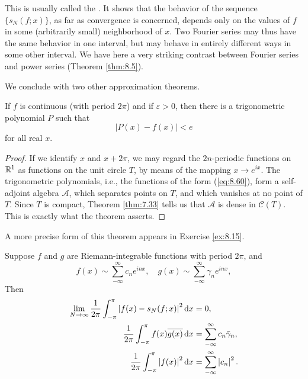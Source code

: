 This is usually called the . 
It shows that the behavior of the sequence $\{s_N(f; x)\}$, as far as convergence is concerned, depends only on the values of $f$ in some (arbitrarily small) neighborhood of $x$. 
Two Fourier series may thus have the same behavior in one interval, but may behave in entirely different ways in some other interval. 
We have here a very striking contrast between Fourier series and power series (Theorem \ref{thm:8.5}).

We conclude with two other approximation theorems.


\begin{thm}
    \label{thm:8.15}
    If $f$ is continuous (with period $2\pi$) and if $\varepsilon > 0$, then there is a trigonometric polynomial $P$ such that 
    \begin{equation*}
        |P(x) - f(x) | < e
    \end{equation*}
    for all real $x$.
\end{thm}

\begin{proof}
    If we identify $x$ and $x + 2\pi$, we may regard the $2n$-periodic functions on ${\protect\mathbb R}^1$ as functions on the unit circle $T$, by means of the mapping $x \rightarrow e^{ix}$. 
    The trigonometric polynomials, i.e., the functions of the form (\ref{eq:8.60}), form a self-adjoint algebra $\mathscr{A}$, which separates points on $T$, and which vanishes at no point of $T$. 
    Since $T$ is compact, Theorem \ref{thm:7.33} tells us that $\mathscr{A}$ is dense in $\mathscr{C}(T)$. 
    This is exactly what the theorem asserts.
\end{proof}

A more precise form of this theorem appears in Exercise \ref{ex:8.15}.


\begin{thm}
    \label{thm:8.16}
    Suppose $f$ and $g$ are Riemann-integrable functions with period $2\pi$, and
    \begin{equation}
        \label{eq:8.82}
        f(x) \sim \sum_{-\infty}^{\infty} c_n e^{inx}, 
        \quad 
        g(x) \sim \sum_{-\infty}^{\infty} \gamma_n e^{inx}, 
    \end{equation}
    Then 
    \begin{align}
        \lim_{N \to \infty} \frac{1}{2\pi} \int_{-\pi}^{\pi} \left| f(x)-s_N(f;x) \right|^2 \d x &= 0, \label{eq:8.83} \\
        \frac{1}{2\pi} \int_{-\pi}^{\pi} f(x)\overline{g(x)} \d x &= \sum_{-\infty}^{\infty} c_n \bar{\gamma}_n , \label{eq:8.84} \\
        \frac{1}{2\pi} \int_{-\pi}^{\pi} \left| f(x) \right|^2 \d x &= \sum_{-\infty}^{\infty} \left| c_n \right|^2 . \label{eq:8.85}
    \end{align}
\end{thm}


